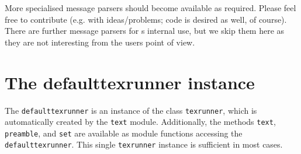 More specialised message parsers should become available as required.
Please feel free to contribute (e.g. with ideas/problems; code is
desired as well, of course). There are further message parsers for
\PyX{}s internal use, but we skip them here as they are not
interesting from the users point of view.

\section{The defaulttexrunner instance}
The \verb|defaulttexrunner| is an instance of the class
\verb|texrunner|, which is automatically created by the \verb|text|
module. Additionally, the methods \verb|text|, \verb|preamble|, and
\verb|set| are available as module functions accessing the
\verb|defaulttexrunner|. This single \verb|texrunner| instance is
sufficient in most cases.

